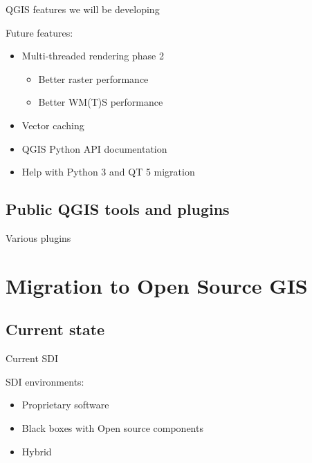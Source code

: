 \begin{frame}{QGIS features we will be developing}
	\begin{block}{Future features:}
		\begin{itemize}
			\item Multi-threaded rendering phase 2 
			\begin{itemize}
				\item Better raster performance
				\item Better WM(T)S performance
			\end{itemize}
			\item Vector caching 
			\item QGIS Python API documentation
			\item Help with Python 3 and QT 5 migration
		
		\end{itemize}
	\end{block}
\end{frame}

\subsection{Public QGIS tools and plugins}
\begin{frame}{Various plugins}
\end{frame}

\section{Migration to Open Source GIS}
\subsection{Current state}
\begin{frame}{Current SDI}
	\begin{block}{SDI environments:}
		\begin{itemize}
			\item Proprietary software
			\item Black boxes with Open source components
			\item Hybrid
		\end{itemize}
	\end{block}
\end{frame}

